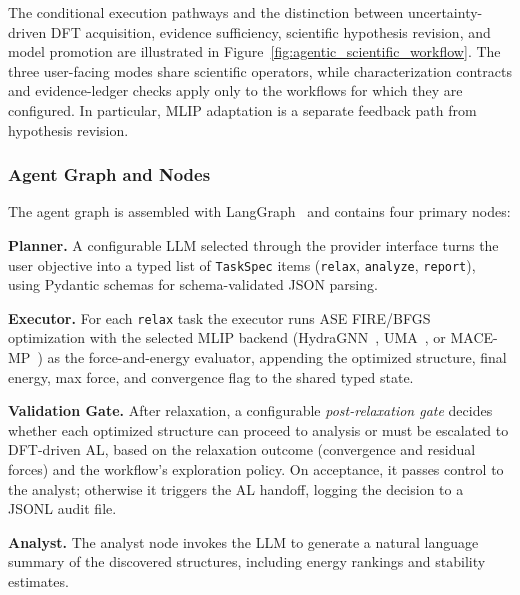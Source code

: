 \documentclass[11pt,a4paper]{article}
\def\ac#1{#1}%
\begin{document}
The conditional execution pathways and the distinction between uncertainty-driven DFT acquisition, evidence sufficiency, scientific hypothesis revision, and model promotion are illustrated in Figure~\ref{fig:agentic_scientific_workflow}. The three user-facing modes share scientific operators, while characterization contracts and evidence-ledger checks apply only to the workflows for which they are configured. In particular, MLIP adaptation is a separate feedback path from hypothesis revision.

\clearpage


\subsubsection{Agent Graph and Nodes}
The agent graph is assembled with LangGraph~\cite{langgraph} and contains four
primary nodes:

\textbf{Planner.} A configurable \ac{LLM} selected through the provider interface turns the user objective into a typed list of \texttt{TaskSpec} items
(\texttt{relax}, \texttt{analyze}, \texttt{report}), using Pydantic schemas for
schema-validated \ac{JSON} parsing.

\textbf{Executor.} For each \texttt{relax} task the executor runs \ac{ASE}
\ac{FIRE}/\ac{BFGS} optimization with the selected \ac{MLIP} backend
(HydraGNN~\cite{hydragnn}, UMA~\cite{wood2025uma}, or
MACE-MP~\cite{batatia2022,batatia2023macemp}) as the force-and-energy evaluator,
appending the optimized structure, final energy, max force, and convergence flag
to the shared typed state.

\textbf{Validation Gate.} After relaxation, a configurable
\emph{post-relaxation gate} decides whether each optimized structure can proceed
to analysis or must be escalated to \ac{DFT}-driven \ac{AL}, based on the
relaxation outcome (convergence and residual forces) and the workflow's
exploration policy. On acceptance, it
passes control to the analyst; otherwise it triggers the \ac{AL} handoff, logging
the decision to a \ac{JSONL} audit file.

\textbf{Analyst.} The analyst node invokes the \ac{LLM} to generate a natural
language summary of the discovered structures, including energy rankings and
stability estimates.
\end{document}
